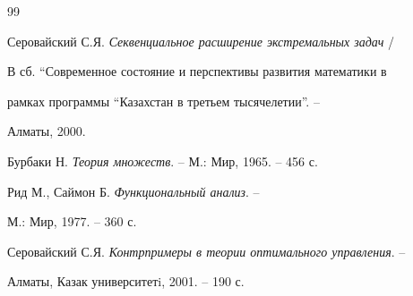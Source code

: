 \begin{thebibliography}{99}


Серовайский С.Я. {\em Секвенциальное расширение экстремальных задач} / 


В сб. ``Современное состояние и перспективы развития математики в 


рамках программы ``Казахстан в третьем тысячелетии''. -- 


Алматы, 2000.




Бурбаки Н. {\em Теория множеств}. -- М.: Мир, 1965. -- 456 с. 




Рид М., Саймон Б. {\em Функциональный анализ}. -- 


М.: Мир, 1977. -- 360 с. 




Серовайский С.Я. {\em Контрпримеры в теории оптимального управления}. -- 


Алматы, Казак университетi, 2001. -- 190 с. 


 


\end{thebibliography} 


 


\vskip 2cm 


 






 


\label{end} 


 


